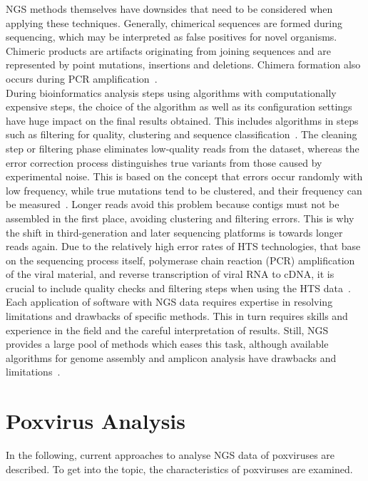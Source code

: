 NGS methods themselves have downsides that need to be considered when applying these techniques. Generally, chimerical sequences are formed during sequencing, which may be interpreted as false positives for novel organisms. Chimeric products are artifacts originating from joining sequences and are represented by point mutations, insertions and deletions. Chimera formation also occurs during PCR amplification~\cite{zylstra1998pcr}.\\
During bioinformatics analysis steps using algorithms with computationally expensive steps, the choice of the algorithm as well as its configuration settings have huge impact on the final results obtained. This includes algorithms in steps such as filtering for quality, clustering and sequence classification~\cite{kopylova2016open}. The cleaning step or filtering phase eliminates low-quality reads from the dataset, whereas the error correction process distinguishes true variants from those caused by experimental noise. This is based on the concept that errors occur randomly with low frequency, while true mutations tend to be clustered, and their frequency can be measured~\cite{zagordi2010error}. Longer reads avoid this problem because contigs must not be assembled in the first place, avoiding clustering and filtering errors. This is why the shift in third-generation and later sequencing platforms is towards longer reads again. Due to the relatively high error rates of HTS technologies, that base on the sequencing process itself, polymerase chain reaction (PCR) amplification of the viral material, and reverse transcription of viral RNA to cDNA, it is crucial to include quality checks and filtering steps when using the HTS data~\cite{beerenwinkel2012challenges}. \\
Each application of software with NGS data requires expertise in resolving limitations and drawbacks of specific methods. This in turn requires skills and experience in the field and the careful interpretation of results. Still, NGS provides a large pool of methods which eases this task, although available algorithms for genome assembly and amplicon analysis have drawbacks and limitations~\cite{finotello2012comparative}.

\section{Poxvirus Analysis}
In the following, current approaches to analyse NGS data of poxviruses are described. To get into the topic, the characteristics of poxviruses are examined.

